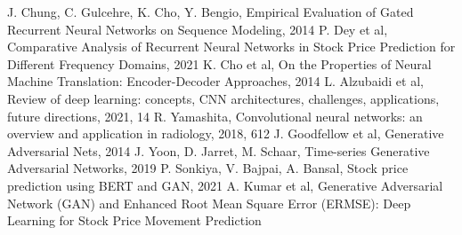 \documentclass[11pt]{article} %
\begin{document}
\begin{thebibliography}{9}
J. Chung, C. Gulcehre, K. Cho, Y. Bengio, Empirical Evaluation of Gated Recurrent Neural Networks on Sequence Modeling, 2014
P. Dey et al, Comparative Analysis of Recurrent Neural Networks in Stock Price Prediction for Different Frequency Domains, 2021 
K. Cho et al, On the Properties of Neural Machine Translation: Encoder-Decoder Approaches, 2014
L. Alzubaidi et al, Review of deep learning: concepts, CNN architectures, challenges, applications, future directions, 2021, 14
R. Yamashita, Convolutional neural networks: an overview and application in radiology, 2018, 612
J. Goodfellow et al, Generative Adversarial Nets, 2014
J. Yoon, D. Jarret, M. Schaar, Time-series Generative Adversarial Networks, 2019
P. Sonkiya, V. Bajpai, A. Bansal, Stock price prediction using BERT and GAN, 2021
A. Kumar et al, Generative Adversarial Network (GAN) and Enhanced Root Mean Square Error (ERMSE): Deep Learning for Stock Price Movement Prediction

\end{thebibliography}
\end{document}
